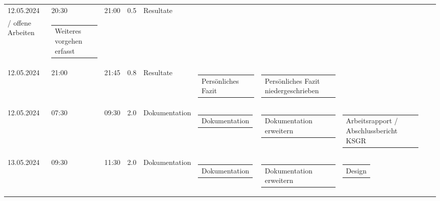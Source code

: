 {\begin{longtable}[H]{lllrllllll}
12.05.2024 & 20:30 & 21:00 & 0.5 & Resultate & \begin{tabular}[c]{@{}l@{}}Weiteres Vorgehen\\/ offene Arbeiten\end{tabular} & \begin{tabular}[c]{@{}l@{}}Weiteres vorgehen erfasst\end{tabular} & \begin{tabular}[c]{@{}l@{}}\end{tabular} & \begin{tabular}[c]{@{}l@{}}\end{tabular} & \begin{tabular}[c]{@{}l@{}}\end{tabular} \\ \midrule
12.05.2024 & 21:00 & 21:45 & 0.8 & Resultate & \begin{tabular}[c]{@{}l@{}}Persönliches Fazit\end{tabular} & \begin{tabular}[c]{@{}l@{}}Persönliches Fazit niedergeschrieben\end{tabular} & \begin{tabular}[c]{@{}l@{}}\end{tabular} & \begin{tabular}[c]{@{}l@{}}\end{tabular} & \begin{tabular}[c]{@{}l@{}}\end{tabular} \\ \midrule
12.05.2024 & 07:30 & 09:30 & 2.0 & Dokumentation & \begin{tabular}[c]{@{}l@{}}Dokumentation\end{tabular} & \begin{tabular}[c]{@{}l@{}}Dokumentation erweitern\end{tabular} & \begin{tabular}[c]{@{}l@{}}Arbeitsrapport / Abschlussbericht KSGR\end{tabular} & \begin{tabular}[c]{@{}l@{}}\end{tabular} & \begin{tabular}[c]{@{}l@{}}\end{tabular} \\ \midrule
13.05.2024 & 09:30 & 11:30 & 2.0 & Dokumentation & \begin{tabular}[c]{@{}l@{}}Dokumentation\end{tabular} & \begin{tabular}[c]{@{}l@{}}Dokumentation erweitern\end{tabular} & \begin{tabular}[c]{@{}l@{}}Design\end{tabular} & \begin{tabular}[c]{@{}l@{}}\end{tabular} & \begin{tabular}[c]{@{}l@{}}\end{tabular} \\ \midrule

\end{longtable}}
